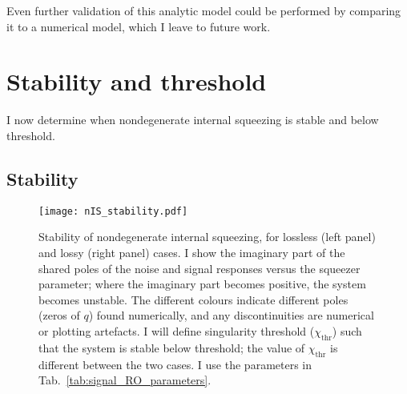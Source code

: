 Even further validation of this analytic model could be performed by comparing it to a numerical model, which I leave to future work.


\section{Stability and threshold}
\label{sec:stability_and_threshold}

I now determine when nondegenerate internal squeezing is stable and below threshold. %

\subsection{Stability}
\label{sec:nIS_stability}

\begin{figure}[ht]
    \centering
    \texttt{[image: nIS\_stability.pdf]}
    \caption{Stability of nondegenerate internal squeezing, for lossless (left panel) and lossy (right panel) cases. I show the imaginary part of the shared poles of the noise and signal responses versus the squeezer parameter; where the imaginary part becomes positive, the system becomes unstable. The different colours indicate different poles (zeros of $q$) found numerically, and any discontinuities are numerical or plotting artefacts. I will define singularity threshold ($\chi_\text{thr}$) such that the system is stable below threshold; the value of $\chi_\text{thr}$ is different between the two cases. I use the parameters in Tab.~\ref{tab:signal_RO_parameters}.}
    \label{fig:nIS_stability}
\end{figure}

